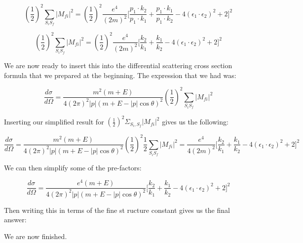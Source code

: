 \documentclass[a4]{article}
\begin{document}
    \begin{equation}
        (\frac{1}{2})^2 \sum_{S_i S_f} |M_{fi}|^2 = (\frac{1}{2})^2 \frac{e^4}{(2m)^2} \Bigg[ \frac{p_1 \cdot k_2}{p_1 \cdot k_1} + \frac{p_1 \cdot k_1}{p_1 \cdot k_2} - 4 (\epsilon_1 \cdot \epsilon_2)^2 + 2 \Bigg]^2
    \end{equation}

    \begin{equation}
        (\frac{1}{2})^2 \sum_{S_i S_f} |M_{fi}|^2 = (\frac{1}{2})^2 \frac{e^4}{(2m)^2} \Bigg[ \frac{k_2}{k_1} + \frac{k_1}{k_2} - 4 (\epsilon_1 \cdot \epsilon_2)^2 + 2 \Bigg]^2
    \end{equation}

    We are now ready to insert this into the differential scattering cross section formula that we prepared at the beginning. The expression that we had was:

    \begin{equation}
        \frac{d \sigma}{d \Omega} = \frac{m^2 (m + E)}{4 (2 \pi)^2 |p| (m + E - |p| \cos \theta)^2} (\frac{1}{2})^2 \sum_{S_i S_f} |M_{fi}|^2
    \end{equation}

    Inserting our simplified result for $(\frac{1}{2})^2 \Sigma_{S_i, S_f} |M_{fi}|^2$ gives us the following:

    \begin{equation}
        \frac{d \sigma}{d \Omega} = \frac{m^2 (m + E)}{4 (2 \pi)^2 |p| (m + E - |p| \cos \theta)^2} (\frac{1}{2})^2 \frac{1}{2} \sum_{S_i S_f} |M_{fi}|^2 = \frac{e^4}{4 (2m)^2} \Bigg[ \frac{k_2}{k_1} + \frac{k_1}{k_2} - 4 (\epsilon_1 \cdot \epsilon_2)^2 + 2 \Bigg]^2
    \end{equation}

    We can then simplify some of the pre-factors:

    \begin{equation}
        \frac{d \sigma}{d \Omega} = \frac{e^4 (m + E)}{4 (2 \pi)^2 |p| (m + E - |p| \cos \theta)^2} \Bigg[ \frac{k_2}{k_1} + \frac{k_1}{k_2} - 4 (\epsilon_1 \cdot \epsilon_2)^2 + 2 \Bigg]^2
    \end{equation}

    Then writing this in terms of the fine st ructure constant gives us the final answer:

    \begin{center}
    \end{center}

    We are now finished.
\end{document}
